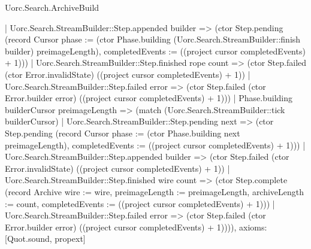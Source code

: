 \begin{lexlean}{Uorc.Search.ArchiveBuild}
\begin{semanticmodule}
{      | Uorc.Search.StreamBuilder::Step.appended builder => (ctor Step.pending (record Cursor {phase := (ctor Phase.building (Uorc.Search.StreamBuilder::finish builder) preimageLength), completedEvents := ((project cursor completedEvents) + 1)}))
      | Uorc.Search.StreamBuilder::Step.finished rope count => (ctor Step.failed (ctor Error.invalidState) ((project cursor completedEvents) + 1))
      | Uorc.Search.StreamBuilder::Step.failed error => (ctor Step.failed (ctor Error.builder error) ((project cursor completedEvents) + 1)))
    | Phase.building builderCursor preimageLength => (match (Uorc.Search.StreamBuilder::tick builderCursor)
      | Uorc.Search.StreamBuilder::Step.pending next => (ctor Step.pending (record Cursor {phase := (ctor Phase.building next preimageLength), completedEvents := ((project cursor completedEvents) + 1)}))
      | Uorc.Search.StreamBuilder::Step.appended builder => (ctor Step.failed (ctor Error.invalidState) ((project cursor completedEvents) + 1))
      | Uorc.Search.StreamBuilder::Step.finished wire count => (ctor Step.complete (record Archive {wire := wire, preimageLength := preimageLength, archiveLength := count, completedEvents := ((project cursor completedEvents) + 1)}))
      | Uorc.Search.StreamBuilder::Step.failed error => (ctor Step.failed (ctor Error.builder error) ((project cursor completedEvents) + 1)))),
  axioms: [Quot.sound, propext]
}
\end{semanticmodule}
\end{lexlean}
